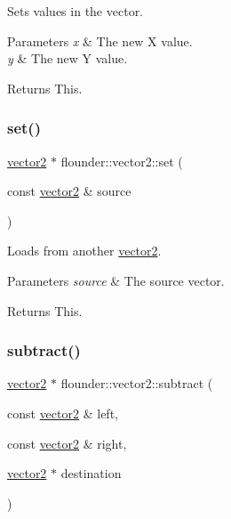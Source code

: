 Sets values in the vector. 


\begin{DoxyParams}{Parameters}
{\em x} & The new X value. \\
\hline
{\em y} & The new Y value. \\
\hline
\end{DoxyParams}
\begin{DoxyReturn}{Returns}
This. 
\end{DoxyReturn}
\mbox{\label{classflounder_1_1vector2_a4b553633e18fa6aafc1a5407fcf1e502}} 
\subsubsection{\texorpdfstring{set()}{set()}\hspace{0.1cm}{\footnotesize\ttfamily [2/2]}}
{\footnotesize\ttfamily \hyperlink{classflounder_1_1vector2}{vector2} $\ast$ flounder\+::vector2\+::set (\begin{DoxyParamCaption}\item[{const \hyperlink{classflounder_1_1vector2}{vector2} \&}]{source }\end{DoxyParamCaption})}



Loads from another \hyperlink{classflounder_1_1vector2}{vector2}. 


\begin{DoxyParams}{Parameters}
{\em source} & The source vector. \\
\hline
\end{DoxyParams}
\begin{DoxyReturn}{Returns}
This. 
\end{DoxyReturn}
\mbox{\label{classflounder_1_1vector2_a5ac1c454a401a063e3324df295b8b8ae}} 
\subsubsection{\texorpdfstring{subtract()}{subtract()}}
{\footnotesize\ttfamily \hyperlink{classflounder_1_1vector2}{vector2} $\ast$ flounder\+::vector2\+::subtract (\begin{DoxyParamCaption}\item[{const \hyperlink{classflounder_1_1vector2}{vector2} \&}]{left,  }\item[{const \hyperlink{classflounder_1_1vector2}{vector2} \&}]{right,  }\item[{\hyperlink{classflounder_1_1vector2}{vector2} $\ast$}]{destination }\end{DoxyParamCaption})\hspace{0.3cm}{\ttfamily [static]}}



